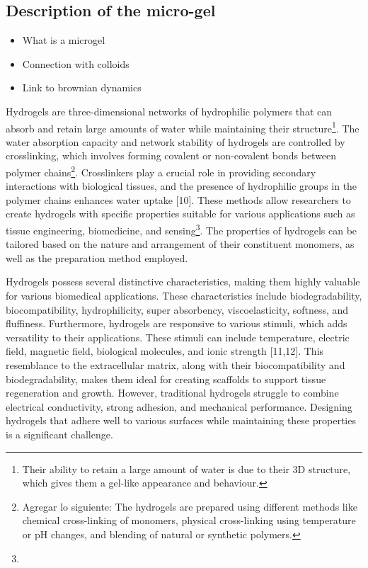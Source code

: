 \documentclass[../../main-notes.tex]{subfiles}
\begin{document}
\subsection{Description of the micro-gel}

\begin{itemize}
    \item What is a microgel
    \item Connection with colloids 
    \item Link to brownian dynamics
\end{itemize}


\citep{priyaComprehensiveReviewHydrogel2024}

Hydrogels are three-dimensional networks of hydrophilic polymers that can absorb and retain large amounts of water while maintaining their structure\footnote{Their ability to retain a large amount of water is due to their 3D structure, which gives them a gel-like appearance and behaviour.}. 
The water absorption capacity and network stability of hydrogels are controlled by crosslinking, which involves forming covalent or non-covalent bonds between polymer chains\footnote{Agregar lo siguiente: The hydrogels are prepared using different methods like chemical cross-linking of monomers, physical cross-linking using temperature or pH changes, and blending of natural or synthetic polymers.}. 
Crosslinkers play a crucial role in providing secondary interactions with biological tissues, and the presence of hydrophilic groups in the polymer chains enhances water uptake [10]. 
These methods allow researchers to create hydrogels with specific properties suitable for various applications such as tissue engineering, biomedicine, and sensing\footnote{}. 
The properties of hydrogels can be tailored based on the nature and arrangement of their constituent monomers, as well as the preparation method employed.


Hydrogels possess several distinctive characteristics, making them highly valuable for various biomedical applications. 
These characteristics include biodegradability, biocompatibility, hydrophilicity, super absorbency, viscoelasticity, softness, and fluffiness. 
Furthermore, hydrogels are responsive to various stimuli, which adds versatility to their applications. 
These stimuli can include temperature, electric field, magnetic field, biological molecules, and ionic strength [11,12]. 
This resemblance to the extracellular matrix, along with their biocompatibility and biodegradability, makes them ideal for creating scaffolds to support tissue regeneration and growth. 
However, traditional hydrogels struggle to combine electrical conductivity, strong adhesion, and mechanical performance.
Designing hydrogels that adhere well to various surfaces while maintaining these properties is a significant challenge.
\end{document}
